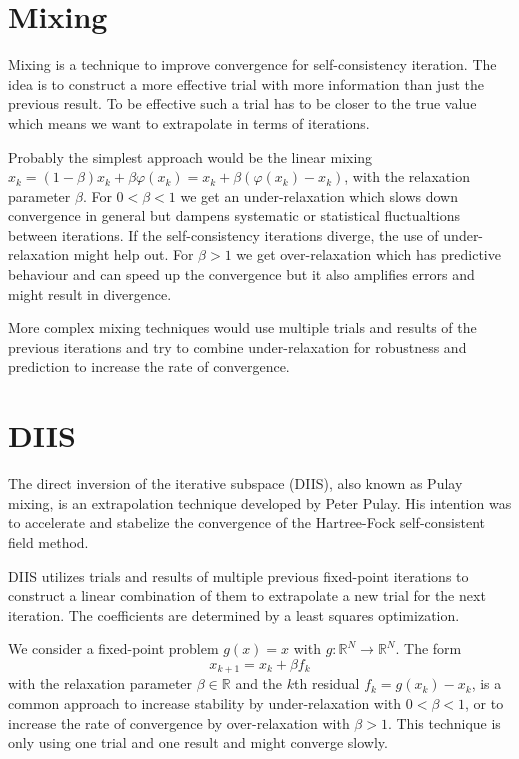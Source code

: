 \section{Mixing}

Mixing is a technique to improve convergence for self-consistency iteration. The idea is to construct a more effective trial with more information than just the previous result. To be effective such a trial has to be closer to the true value which means we want to extrapolate in terms of iterations.

Probably the simplest approach would be the linear mixing \(\hat{x}_k = (1-\beta) x_k + \beta \varphi(x_k) = x_k + \beta (\varphi(x_k) - x_k)\), with the relaxation parameter \(\beta\).
For \(0 < \beta < 1\) we get an under-relaxation which slows down convergence in general but dampens systematic or statistical fluctualtions between iterations. If the self-consistency iterations diverge, the use of under-relaxation might help out.
For \(\beta > 1\) we get over-relaxation which has predictive behaviour and can speed up the convergence but it also amplifies errors and might result in divergence.

More complex mixing techniques would use multiple trials and results of the previous iterations and try to combine under-relaxation for robustness and prediction to increase the rate of convergence.

\section{DIIS}

The direct inversion of the iterative subspace (DIIS), also known as Pulay mixing, is an extrapolation technique developed by Peter Pulay. His intention was to accelerate and stabelize the convergence of the Hartree-Fock self-consistent field method.

DIIS utilizes trials and results of multiple previous fixed-point iterations to construct a linear combination of them to extrapolate a new trial for the next iteration. The coefficients are determined by a least squares optimization.

We consider a fixed-point problem \(g(x) = x\) with \(g\colon \mathbb{R}^N \to \mathbb{R}^N\). The form
\begin{equation} \label{eq:diis_linmix}
x_{k+1} = x_k + \beta f_k
\end{equation}
with the relaxation parameter \(\beta \in \mathbb{R}\) and the \(k\)th residual \(f_k = g(x_k) - x_k\), is a common approach to increase stability by under-relaxation with \(0 < \beta < 1\), or to increase the rate of convergence by over-relaxation with \(\beta > 1\). This technique is only using one trial and one result and might converge slowly.


